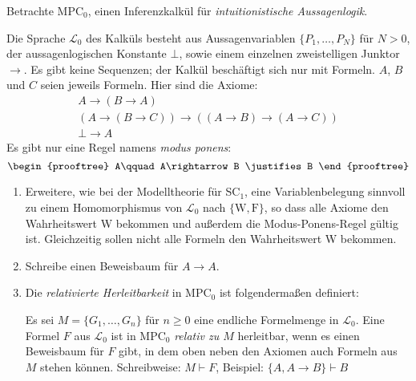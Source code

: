 \begin{aufgabe}
  Betrachte MPC$_0$, einen Inferenzkalkül für
  \textit{intuitionistische Aussagenlogik}.
  
  Die Sprache $\mathcal{L}_0$ des Kalküls besteht aus
  Aussagenvariablen $\{P_1, \ldots, P_N\}$ für
  $N>0$, der aussagenlogischen Konstante $\bot$, sowie einem einzelnen
  zweistelligen Junktor $\rightarrow$.  Es gibt keine Sequenzen; der
  Kalkül beschäftigt sich nur mit Formeln.  $A$, $B$ und $C$ seien
  jeweils Formeln.  Hier sind die Axiome:
  \begin{displaymath}
    \begin{array}{c}
      A\rightarrow(B\rightarrow A)
      \\
      (A\rightarrow(B\rightarrow C))\rightarrow ((A\rightarrow
      B)\rightarrow (A\rightarrow C))
      \\
      \bot\rightarrow A
    \end{array}
  \end{displaymath}
  Es gibt nur eine Regel namens \textit{modus ponens}:
  \begin{displaymath}
    \begin{prooftree}
       A\qquad A\rightarrow B \justifies B
    \end{prooftree}
  \end{displaymath}
  \begin{enumerate}
  \item Erweitere, wie bei der Modelltheorie für SC$_1$, eine
    Variablenbelegung sinnvoll zu einem Homomorphismus von
    $\mathcal{L}_0$ nach $\{\mathrm{W}, \mathrm{F}\}$, so dass alle
    Axiome den Wahrheitswert W bekommen und außerdem die Modus-Ponens-Regel
    gültig ist.  Gleichzeitig sollen nicht alle Formeln den
    Wahrheitswert W bekommen.
  \item Schreibe einen Beweisbaum für $A\rightarrow
    A$.
  \item Die \textit{relativierte Herleitbarkeit} in MPC$_0$ ist
    folgendermaßen definiert:

    Es sei $M =\{G_1, \ldots, G_n\}$ für $n\geq 0$ eine endliche
    Formelmenge in $\mathcal{L}_0$.  Eine Formel $F$ aus
    $\mathcal{L}_0$ ist in MPC$_0$ \textit{relativ zu $M$} herleitbar,
    wenn es einen Beweisbaum für $F$ gibt, in dem oben neben den
    Axiomen auch Formeln aus $M$ stehen können.  Schreibweise:
    \(M \vdash F\),
    Beispiel:
    \(\{A,A\rightarrow B\} \vdash B\)


\end{enumerate}
\end{aufgabe}
